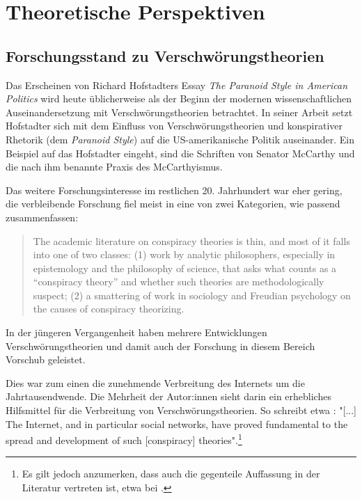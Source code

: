 \section{Theoretische Perspektiven}

\subsection{Forschungsstand zu Verschwörungstheorien}

Das Erscheinen von Richard Hofstadters Essay \textit{The Paranoid Style in American Politics} \parencite[][]{hofstadter_2008} wird heute üblicherweise als der Beginn der modernen wissenschaftlichen Auseinandersetzung mit Verschwörungstheorien betrachtet.
In seiner Arbeit setzt Hofstadter sich mit dem Einfluss von Verschwörungstheorien und konspirativer Rhetorik (dem \textit{Paranoid Style}) auf die US-amerikanische Politik auseinander.
Ein Beispiel auf das Hofstadter eingeht, sind die Schriften von Senator McCarthy und die nach ihm benannte Praxis des McCarthyismus.

Das weitere Forschungsinteresse im restlichen 20. Jahrhundert war eher gering, die verbleibende Forschung fiel meist in eine von zwei Kategorien, wie \textcite{sunstein_2008} passend zusammenfassen:

\begin{quotation}
    The academic literature on conspiracy theories is thin, and most of it falls into one 
    of two classes: (1) work by analytic philosophers, especially in epistemology and the 
    philosophy of science, that asks what counts as a “conspiracy theory” and whether such theories are methodologically suspect; (2) a smattering of work in sociology and Freudian psychology on the causes of conspiracy theorizing. \parencite[][2]{sunstein_2008}
\end{quotation}

In der jüngeren Vergangenheit haben mehrere Entwicklungen Verschwörungstheorien und damit auch der Forschung in diesem Bereich Vorschub geleistet.

Dies war zum einen die zunehmende Verbreitung des Internets um die Jahrtausendwende.
Die Mehrheit der Autor:innen sieht darin ein erhebliches Hilfsmittel für die Verbreitung von Verschwörungstheorien.
So schreibt etwa \textcite[492]{stano_2020}: "[...] The Internet, and in particular social networks, have proved fundamental to the spread and development of such [conspiracy] theories".\footnote{Es gilt jedoch anzumerken, dass auch die gegenteile Auffassung in der Literatur vertreten ist, etwa bei \textcite{clarke_2007}.}

